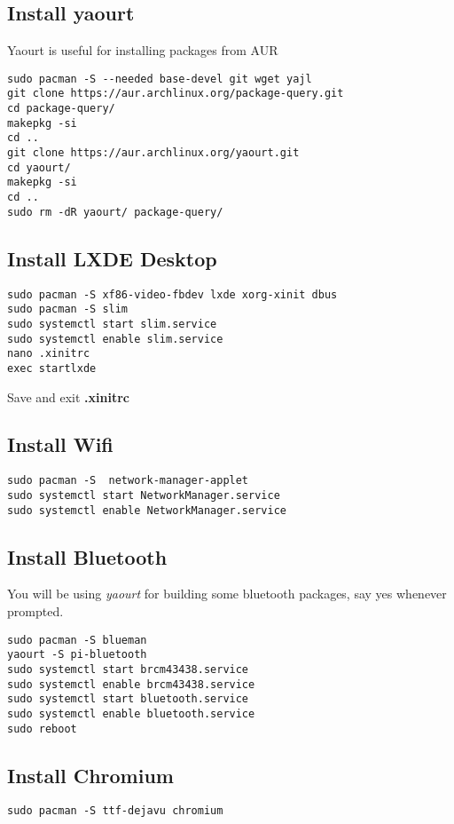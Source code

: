 \documentclass[journal,12pt,twocolumn]{IEEEtran}
\begin{document}
\subsection{Install yaourt}
Yaourt is useful for installing packages from AUR
\begin{lstlisting}
sudo pacman -S --needed base-devel git wget yajl 
git clone https://aur.archlinux.org/package-query.git
cd package-query/
makepkg -si
cd ..
git clone https://aur.archlinux.org/yaourt.git
cd yaourt/
makepkg -si
cd ..
sudo rm -dR yaourt/ package-query/

\end{lstlisting}
\subsection{Install LXDE Desktop}
\begin{lstlisting}
sudo pacman -S xf86-video-fbdev lxde xorg-xinit dbus	
sudo pacman -S slim
sudo systemctl start slim.service
sudo systemctl enable slim.service
nano .xinitrc
exec startlxde
\end{lstlisting}
Save and exit \textbf{.xinitrc}
\subsection{Install Wifi}
\begin{lstlisting}
sudo pacman -S  network-manager-applet
sudo systemctl start NetworkManager.service
sudo systemctl enable NetworkManager.service
\end{lstlisting}
\subsection{Install Bluetooth}
You will be using {\em yaourt} for building some bluetooth packages, say yes whenever prompted.
\begin{lstlisting}
sudo pacman -S blueman
yaourt -S pi-bluetooth
sudo systemctl start brcm43438.service
sudo systemctl enable brcm43438.service
sudo systemctl start bluetooth.service
sudo systemctl enable bluetooth.service
sudo reboot
\end{lstlisting}
\subsection{Install Chromium}
\begin{lstlisting}
sudo pacman -S ttf-dejavu chromium
\end{lstlisting}
\end{document}
